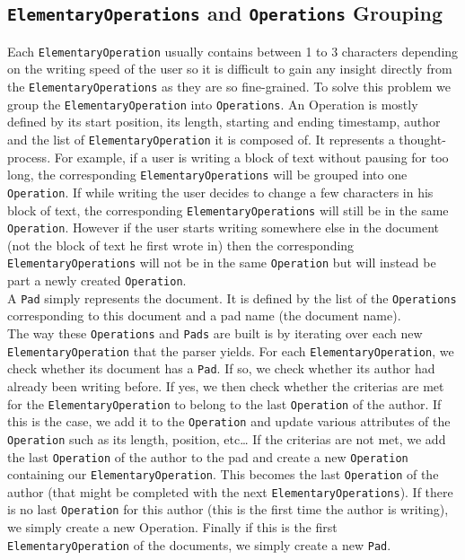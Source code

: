 \documentclass[a4, twocolumn, 12pt]{article}
\begin{document}
\subsection{\texttt{ElementaryOperations} and \texttt{Operations} Grouping}
Each \texttt{ElementaryOperation} usually contains between 1 to 3 characters depending on the writing speed of the user so it is difficult to gain any insight directly from the \texttt{ElementaryOperations} as they are so fine-grained. To solve this problem we group the \texttt{ElementaryOperation} into \texttt{Operations}. An Operation is mostly defined by its start position, its length, starting and ending timestamp, author and the list of \texttt{ElementaryOperation} it is composed of. It represents a thought-process. For example, if a user is writing a block of text without pausing for too long, the corresponding \texttt{ElementaryOperations} will be grouped into one \texttt{Operation}. If while writing the user decides to change a few characters in his block of text, the corresponding \texttt{ElementaryOperations} will still be in the same \texttt{Operation}. However if the user starts writing somewhere else in the document (not the block of text he first wrote in) then the corresponding \texttt{ElementaryOperations} will not be in the same \texttt{Operation} but will instead be part a newly created \texttt{Operation}.\\
A \texttt{Pad} simply represents the document. It is defined by the list of the \texttt{Operations} corresponding to this document and a pad name (the document name).\\
The way these \texttt{Operations} and \texttt{Pads} are built is by iterating over each new \texttt{ElementaryOperation} that the parser yields. For each \texttt{ElementaryOperation}, we check whether its document has a \texttt{Pad}. If so, we check whether its author had already been writing before. If yes, we then check whether the criterias are met for the \texttt{ElementaryOperation} to belong to the last \texttt{Operation} of the author. If this is the case, we add it to the \texttt{Operation} and update various attributes of the \texttt{Operation} such as its length, position, etc… If the criterias are not met, we add the last \texttt{Operation} of the author to the pad and create a new \texttt{Operation} containing our \texttt{ElementaryOperation}. This becomes the last \texttt{Operation} of the author (that might be completed with the next \texttt{ElementaryOperations}). If there is no last \texttt{Operation} for this author (this is the first time the author is writing), we simply create a new Operation. Finally if this is the first \texttt{ElementaryOperation} of the documents, we simply create a new \texttt{Pad}.\\
\end{document}
